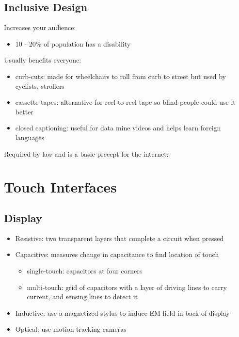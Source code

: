 \documentclass[]{article}
\theoremstyle{definition}
\begin{document}
	\subsection{Inclusive Design}
	Increases your audience:
	\begin{itemize}
		\item 10 - 20\% of population has a disability
	\end{itemize}
	Usually benefits everyone:
	\begin{itemize}
		\item curb-cuts: made for wheelchairs to roll from curb to street but used by cyclists, strollers
		\item cassette tapes: alternative for reel-to-reel tape so blind people could use it better
		\item closed captioning: useful for data mine videos and helps learn foreign languages
	\end{itemize}
	Required by law and is a basic precept for the internet:

	\section{Touch Interfaces}
	\subsection{Display}
	\begin{itemize}
		\item Resistive: two transparent layers that complete a circuit when pressed
		\item Capacitive: measures change in capacitance to find location of touch
			\begin{itemize}
				\item single-touch: capacitors at four corners
				\item multi-touch: grid of capacitors with a layer of driving lines to carry current, and sensing lines to detect it
			\end{itemize}
		\item Inductive: use a magnetized stylus to induce EM field in back of display
		\item Optical: use motion-tracking cameras
	\end{itemize}
\end{document}

